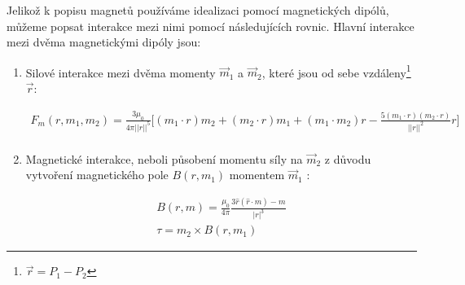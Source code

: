 Jelikož k popisu magnetů používáme idealizaci pomocí magnetických dipólů, můžeme popsat interakce mezi nimi pomocí následujících rovnic.
Hlavní interakce mezi dvěma magnetickými dipóly jsou:
\begin{enumerate}[topsep=0pt, partopsep=0pt]
    \setlength{\itemsep}{0pt}%
    \setlength{\parskip}{0pt}%

    \item Silové interakce \cite{magnetic_force} mezi dvěma momenty $\vec{m}_1$ a $\vec{m}_2$, které jsou od sebe vzdáleny\footnote{$\vec{r} = P_1 - P_2$} $\vec{r}$:

          \begin{equation}
              \label{eq:F_m}
              \begin{split}
                  F_m (r,m_1,m_2) = \frac{3\mu_0}{4\pi ||r||^5}
                  \bigg[
                      (m_1\cdot r) m_2 +
                      (m_2\cdot r) m_1 +
                      (m_1\cdot m_2) r -
                      \frac{5(m_1\cdot r)(m_2\cdot r)}{||r||^2} r
                  \bigg] \\
              \end{split}
          \end{equation}

    \item Magnetické interakce, neboli působení momentu síly \cite{magnetic_torque} na $\vec{m}_2$ z důvodu vytvoření magnetického pole $B(r, m_1)$ momentem $\vec{m}_1$ \cite{magnetic_force}:

          \begin{equation}
              \label{eq:B}
              \begin{split}
                  B (r, m) = \frac{\mu_0}{4\pi}\frac{3 \hat{r}(\hat{r}\cdot m) - m}{|r|^3} \\
                  \tau = m_2 \times B(r, m_1)
              \end{split}
          \end{equation}
\end{enumerate}
